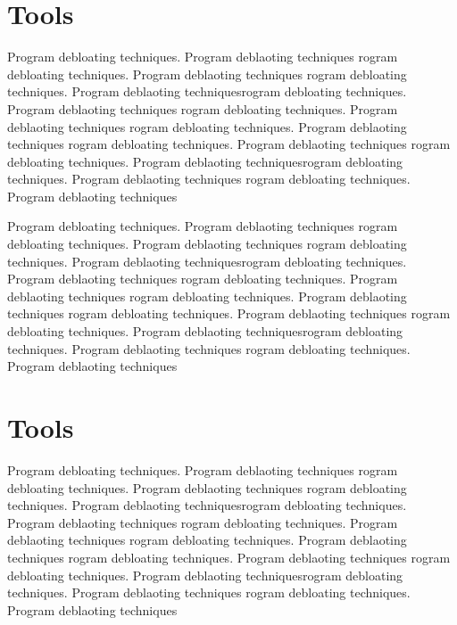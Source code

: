 \documentclass{relatorio}
\begin{document}
	\section{Tools}%
\label{Tools}

Program debloating techniques. Program deblaoting techniques rogram debloating techniques. Program deblaoting techniques
rogram debloating techniques. Program deblaoting techniquesrogram debloating techniques. Program deblaoting techniques
rogram debloating techniques. Program deblaoting techniques rogram debloating techniques. Program deblaoting techniques
rogram debloating techniques. Program deblaoting techniques 
rogram debloating techniques. Program deblaoting techniquesrogram debloating techniques. Program deblaoting techniques
rogram debloating techniques. Program deblaoting techniques

Program debloating techniques. Program deblaoting techniques rogram debloating techniques. Program deblaoting techniques
rogram debloating techniques. Program deblaoting techniquesrogram debloating techniques. Program deblaoting techniques
rogram debloating techniques. Program deblaoting techniques rogram debloating techniques. Program deblaoting techniques
rogram debloating techniques. Program deblaoting techniques 
rogram debloating techniques. Program deblaoting techniquesrogram debloating techniques. Program deblaoting techniques
rogram debloating techniques. Program deblaoting techniques

\section{Tools}%
\label{Tools}

Program debloating techniques. Program deblaoting techniques rogram debloating techniques. Program deblaoting techniques
rogram debloating techniques. Program deblaoting techniquesrogram debloating techniques. Program deblaoting techniques
rogram debloating techniques. Program deblaoting techniques rogram debloating techniques. Program deblaoting techniques
rogram debloating techniques. Program deblaoting techniques 
rogram debloating techniques. Program deblaoting techniquesrogram debloating techniques. Program deblaoting techniques
rogram debloating techniques. Program deblaoting techniques
\end{document}
